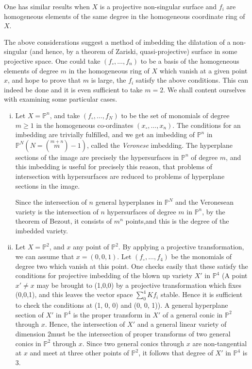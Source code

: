 One has similar results when $X$ is a projective non-singular surface
and $f_i$ are homogeneous elements of the same degree in the
homogeneous coordinate ring of $X$. 

The above considerations suggest a method of imbedding the dilatation
of a non-singular (and hence, by a theorem of Zariski,
quasi-projective) surface in some projective space. One could take
$(f_\circ , \ldots , f_n)$ to be a basis of the homogeneous elements of
degree $m$ in the homogeneous ring of $X$ which vanish at a given
point $x$, and hope to prove that $m$ is large, the $f_i$ satisfy the
above conditions. This can indeed be done and it is even sufficient to
take $m=2$. We shall content ourselves with examining some
particular cases. 
\begin{enumerate}[i)]
\item Let $X=\mathbb{P}^n$, and take  $(f_\circ, \ldots , f_N)$ to be the
  set of monomials of degree $m \geq 1$ in the homogeneous
  co-ordinates $(x_\circ , \ldots , x_n)$. The conditions for an imbedding
  are trivially fulfilled, and we get an imbedding of $\mathbb{P}^n$ in
  $\mathbb{P}^N(N= (\overset{m+n}m)-1)$, called the \textit{Veronese}
  imbedding. The hyperplane sections of the image are precisely the
  hypersurfaces in $\mathbb{P}^n$ of degree $m$, and this imbedding
  is useful for precisely this reason, that problems of intersection
  with hypersurfaces are reduced to problems of hyperplane sections in
  the image. 

  Since the intersection of $n$ general hyperplanes in $\mathbb{P}^N$
  and the Veron\-esean variety is the intersection of $n$ hypersurfaces
  of degree $m$ in $\mathbb{P}^n$, by the theorem of Bezout, it
  consists of $m^n$ points,\pageoriginale  and this is the degree of
  the imbedded  variety.  

\item Let $ X =\mathbb{P}^2$, and $x$ any point of $\mathbb{P}^2$. By
  applying a projective transformation, we can assume that
  $x=(0,0,1)$. Let  $(f_\circ , \ldots , f_4)$ be the monomials of degree
  two which vanish at this point. One checks easily that these satisfy
  the conditions for projective imbedding of the blown up variety $X'$
  in $\mathbb{P}^4$ (A point $x' \neq x$ may be brought to (1,0,0) by a
  projective transformation which fixes (0,0,1), and this leaves the
  vector space $\sum \limits^4_0 K f_i$ stable. Hence it is sufficient
  to check the conditions at (1, 0, 0) and (0, 0, 1)). A general
  hyperplane section of $X'$ in $\mathbb{P}^4$ is the proper transform
  in $X'$ of a general conic in $\mathbb{P}^2$ through $x$. Hence, the
  intersection of $X'$ and a general linear variety of dimension
  $2$must be the intersection of proper transforms of two general
  conics in $\mathbb{P}^2$ through $x$. Since two general conics
  through $x$ are non-tangential at $x$ and meet at three other points
  of $\mathbb{P}^2$, it follows that degree of $X'$ in $\mathbb{P}^4$
  is 3. 


\end{enumerate}
